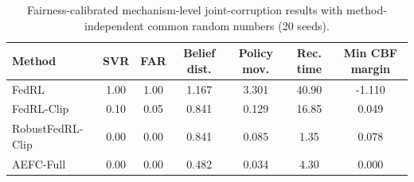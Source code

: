 \begin{table}[t]
\centering
\caption{Fairness-calibrated mechanism-level joint-corruption results with method-independent common random numbers (20 seeds).}
\label{tab:calibrated-baselines}
\scriptsize
\setlength{\tabcolsep}{5pt}
\begin{tabular}{@{}lcccccc@{}}
\toprule
Method & SVR & FAR & Belief dist. & Policy mov. & Rec. time & Min CBF margin\\
\midrule
FedRL & 1.00 & 1.00 & 1.167 & 3.301 & 40.90 & -1.110\\
FedRL-Clip & 0.10 & 0.05 & 0.841 & 0.129 & 16.85 & 0.049\\
RobustFedRL-Clip & 0.00 & 0.00 & 0.841 & 0.085 & 1.35 & 0.078\\
AEFC-Full & 0.00 & 0.00 & 0.482 & 0.034 & 4.30 & 0.000\\
\bottomrule
\end{tabular}
\end{table}
